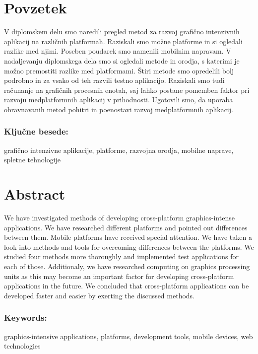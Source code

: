 \chapter*{Povzetek}

V diplomskem delu smo naredili pregled metod za razvoj grafično intenzivnih aplikacij na različnih platformah. Raziskali smo možne platforme in si ogledali razlike med njimi. Poseben poudarek smo namenili mobilnim napravam. V nadaljevanju diplomskega dela smo si ogledali metode in orodja, s katerimi je možno premostiti razlike med platformami. Štiri metode smo opredelili bolj podrobno in za vsako od teh razvili testno aplikacijo. Raziskali smo tudi računanje na grafičnih procesnih enotah, saj lahko postane pomemben faktor pri razvoju medplatformnih aplikacij v prihodnosti. Ugotovili smo, da uporaba obravnavanih metod pohitri in poenostavi razvoj medplatformnih aplikacij.

\subsection*{Ključne besede:}

grafično intenzivne aplikacije, platforme, razvojna orodja, mobilne naprave, spletne tehnologije

\clearemptydoublepage

\chapter*{Abstract}


We have investigated methods of developing cross-platform graphics-intense applications. We have researched different platforms and pointed out differences between them. Mobile platforms have received special attention. We have taken a look into methods and tools for overcoming differences between the platforms. We studied four methods more thoroughly and implemented test applications for each of those. Additionaly, we have researched computing on graphics processing units as this may become an important factor for developing cross-platform applications in the future. We concluded that cross-platform applications can be developed faster and easier by exerting the discussed methods.

\subsection*{Keywords:}

graphics-intensive applications, platforms, development tools, mobile devices, web technologies 

